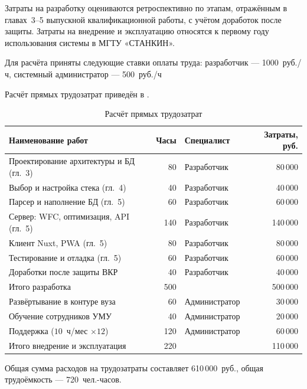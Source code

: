 Затраты на разработку оцениваются ретроспективно по этапам, отражённым в главах~3--5 выпускной квалификационной работы, с учётом доработок после защиты. Затраты на внедрение и эксплуатацию относятся к первому году использования системы в МГТУ «СТАНКИН».

Для расчёта приняты следующие ставки оплаты труда: разработчик --- 1000~руб./ч, системный администратор --- 500~руб./ч

Расчёт прямых трудозатрат приведён в .

\begin{table}[H]
	\centering
	\caption{Расчёт прямых трудозатрат}
	\label{tab:labor}
	\begin{tabularx}{\textwidth}{|>{\raggedright\arraybackslash}X|r|>{\raggedright\arraybackslash}p{2.6cm}|r|}
		\hline
		\textbf{Наименование работ} &
		\textbf{Часы} &
		\textbf{Специалист} &
		\textbf{Затраты, руб.} \\
		\hline
		Проектирование архитектуры и БД (гл.~3) & 80 & Разработчик & 80\,000 \\
		\hline
		Выбор и настройка стека (гл.~4) & 40 & Разработчик & 40\,000 \\
		\hline
		Парсер и наполнение БД (гл.~5) & 60 & Разработчик & 60\,000 \\
		\hline
		Сервер: WFC, оптимизация, API (гл.~5) & 140 & Разработчик & 140\,000 \\
		\hline
		Клиент Nuxt, PWA (гл.~5) & 80 & Разработчик & 80\,000 \\
		\hline
		Тестирование и отладка (гл.~5) & 60 & Разработчик & 60\,000 \\
		\hline
		Доработки после защиты ВКР & 40 & Разработчик & 40\,000 \\
		\hline
		Итого разработка & 500 & & 500\,000 \\
		\hline
		Развёртывание в контуре вуза & 60 & Администратор & 30\,000 \\
		\hline
		Обучение сотрудников УМУ & 40 & Администратор & 20\,000 \\
		\hline
		Поддержка ($10$~ч/мес $\times 12$) & 120 & Администратор & 60\,000 \\
		\hline
		Итого внедрение и эксплуатация & 220 & & 110\,000 \\
		\hline
	\end{tabularx}
\end{table}

Общая сумма расходов на трудозатраты составляет 610\,000~руб., общая трудоёмкость --- 720~чел.-часов.


